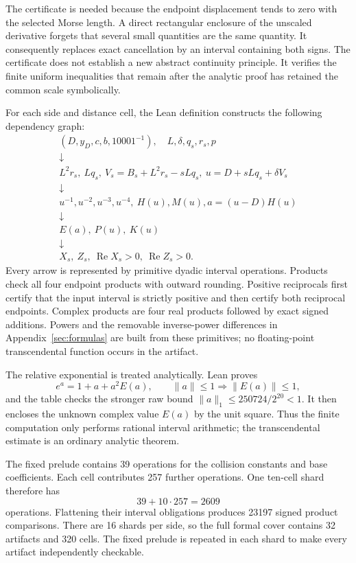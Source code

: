 \documentclass[11pt]{article}
\newcommand{\re}{\operatorname{Re}}
\begin{document}
The certificate is needed because the endpoint displacement tends to zero with the selected
Morse length.  A direct rectangular enclosure of the unscaled derivative forgets that several
small quantities are the same quantity.  It consequently replaces exact cancellation by an
interval containing both signs.  The certificate does not establish a new abstract continuity
principle.  It verifies the finite uniform inequalities that remain after the analytic proof has
retained the common scale symbolically.

For each side and distance cell, the Lean definition constructs the following dependency graph:
\[
\begin{array}{c}
(D,y_D,c,b,10001^{-1}),\quad L,\delta,q_s,r_s,p\\[2pt]
\downarrow\\[-2pt]
L^2r_s,\ Lq_s,\ V_s=B_s+L^2r_s-sLq_s,\ u=D+sLq_s+\delta V_s\\[2pt]
\downarrow\\[-2pt]
u^{-1},u^{-2},u^{-3},u^{-4},\ H(u),M(u),a=(u-D)H(u)\\[2pt]
\downarrow\\[-2pt]
E(a),\ P(u),\ K(u)\\[2pt]
\downarrow\\[-2pt]
X_s,\ Z_s,\ \re X_s>0,\ \re Z_s>0.
\end{array}
\]
Every arrow is represented by primitive dyadic interval operations.  Products check all four
endpoint products with outward rounding.  Positive reciprocals first certify that the input
interval is strictly positive and then certify both reciprocal endpoints.  Complex products are
four real products followed by exact signed additions.  Powers and the removable inverse-power
differences in Appendix~\ref{sec:formulas} are built from these primitives; no floating-point
transcendental function occurs in the artifact.

The relative exponential is treated analytically.  Lean proves
\[
 e^a=1+a+a^2E(a),\qquad \lVert a\rVert\leq1\Longrightarrow \lVert E(a)\rVert\leq1,
\]
and the table checks the stronger raw bound
\(\lVert a\rVert_1\leq250724/2^{20}<1\).  It then encloses the unknown complex value
\(E(a)\) by the unit square.  Thus the finite computation only performs rational interval
arithmetic; the transcendental estimate is an ordinary analytic theorem.

The fixed prelude contains 39 operations for the collision constants and base coefficients.
Each cell contributes 257 further operations.  One ten-cell shard therefore has
\[
 39+10\cdot257=2609
\]
operations.  Flattening their interval obligations produces 23197 signed product comparisons.
There are 16 shards per side, so the full formal cover contains 32 artifacts and 320 cells.
The fixed prelude is repeated in each shard to make every artifact independently checkable.
\end{document}
